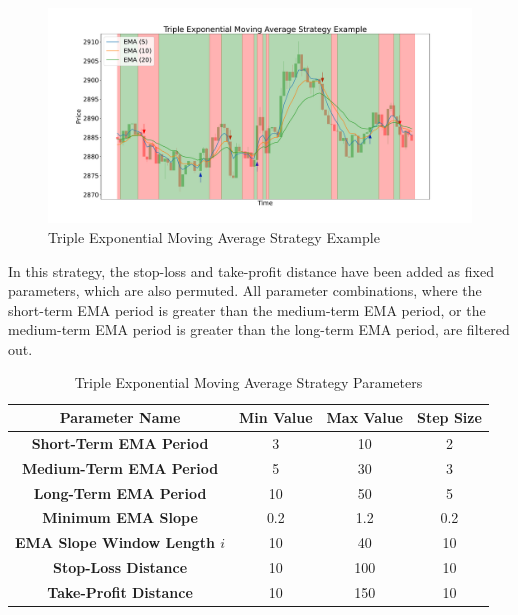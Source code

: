 \begin{figure}[H]
    \centering
    \includegraphics[width=\textwidth]{images/trading-strategies/ema-example}
    \caption{Triple Exponential Moving Average Strategy Example}
    \label{fig:ema-example}
\end{figure}

In this strategy, the stop-loss and take-profit distance have been added as fixed parameters, which are also permuted.
All parameter combinations, where the short-term EMA period is greater than the medium-term EMA period, or the medium-term EMA period is greater than the long-term EMA period, are filtered out.

\begin{table}[H]
    \centering
    \begin{tabular}{cccc}
        \toprule
        Parameter Name & Min Value & Max Value & Step Size
        \\
        \midrule
        \textbf{Short-Term EMA Period}       & 3   & 10  & 2   \\
        \textbf{Medium-Term EMA Period}      & 5   & 30  & 3   \\
        \textbf{Long-Term EMA Period}        & 10  & 50  & 5   \\
        \textbf{Minimum EMA Slope}           & 0.2 & 1.2 & 0.2 \\
        \textbf{EMA Slope Window Length $i$} & 10  & 40  & 10  \\
        \textbf{Stop-Loss Distance}          & 10  & 100 & 10  \\
        \textbf{Take-Profit Distance}        & 10  & 150 & 10  \\
        \bottomrule
    \end{tabular}
    \caption{Triple Exponential Moving Average Strategy Parameters}
    \label{tbl:ema-strategy-parameters}
\end{table}

